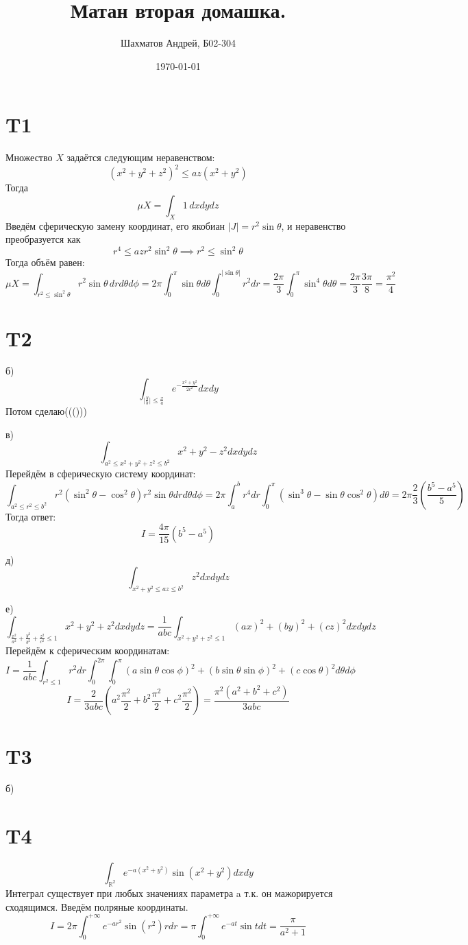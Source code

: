 \documentclass[12pt]{article}
\title{Матан вторая домашка.}
\author{Шахматов Андрей, Б02-304}
\date{\today}
\begin{document}
\maketitle
\tableofcontents

\section{T1}
Множество $X$ задаётся следующим неравенством: 
\[
    (x^2 + y^2 + z^2)^2 \leq az(x^2 + y^2)
\]
Тогда 
\[
    \mu X = \int_{X} 1 \,dx dy dz
\]
Введём сферическую замену координат, его якобиан $\vert J \vert = r^2 \sin \theta$, и неравенство преобразуется как
\[
    r^4 \leq az r^2 \sin^2 \theta \implies r^2 \leq \sin^2 \theta 
\]
Тогда объём равен: 
\[
    \mu X = \int_{r^2 \leq \sin^2 \theta} r^2 \sin \theta \,dr d \theta d \phi = 2\pi \int_{0}^{\pi} \sin \theta d \theta \int_{0}^{\vert \sin \theta \vert} r^2 dr = 
    \frac{2\pi}{3} \int_0^{\pi} \sin^4 \theta d \theta = \frac{2\pi}{3} \frac{3\pi}{8} = \frac{\pi^2}{4}
\]
\section{T2}
б)
\[
    \int_{\vert \frac{y}{b} \vert \leq \frac{x}{a}} e^{-\frac{x^2 + y^2}{2c^2}} dx dy
\]
Потом сделаю((()))


в)
\[
    \int_{a^2 \leq x^2 + y^2 + z^2 \leq b^2} x^2 + y^2 - z^2 dx dy dz
\]
Перейдём в сферическую систему координат: 
\[
    \int_{a^2 \leq r^2 \leq b^2} r^2(\sin^2 \theta - \cos^2 \theta) r^2 \sin \theta dr d \theta  d \phi = 
    2\pi \int_a^b r^4 dr \int_0^{\pi} (\sin^3 \theta - \sin \theta \cos^2 \theta ) d \theta = 
    2\pi \frac{2}{3} \left( \frac{b^5 - a^5}{5} \right)
\]
Тогда ответ: 
\[
    I = \frac{4\pi}{15} (b^5 - a^5)
\]

д)
\[
    \int_{x^2 + y^2 \leq az \leq b^2} z^2 dx dy dz
\] 

е) 
\[
    \int_{\frac{x^2}{a^2} + \frac{y^2}{b^2} + \frac{z^2}{c^2} \leq 1} x^2 + y^2 + z^2 dx dy dz = 
    \frac{1}{abc} \int_{x^2 + y^2 + z^2 \leq 1} (ax)^2 + (by)^2 + (cz)^2 dx dy dz
\]
Перейдём к сферическим координатам: 
\[
    I = \frac{1}{abc} \int_{r^2 \leq 1} r^2 dr \int_{0}^{2\pi} \int_{0}^{\pi} (a\sin \theta \cos \phi)^2 + (b\sin \theta \sin \phi)^2 + (c\cos \theta)^2 d \theta d \phi
\]
\[
    I = \frac{2}{3abc} \left( a^2\frac{\pi^2}{2} + b^2\frac{\pi^2}{2} + c^2\frac{\pi^2}{2} \right) = 
    \frac{\pi^2 (a^2 + b^2 + c^2)}{3abc}
\]

\section{T3}
б)

\section{T4}
\[
    \int_{\mathbb{R}^2} e^{-a(x^2 + y^2)} \sin (x^2 + y^2) dx dy
\]
Интеграл существует при любых значениях параметра a т.к. он мажорируется сходящимся. Введём полряные координаты. 
\[
    I = 2 \pi \int_{0}^{+\infty} e^{-ar^2} \sin (r^2) r dr = \pi \int_{0}^{+\infty} e^{-at} \sin t dt = \frac{\pi}{a^2 + 1}
\]
\end{document}

